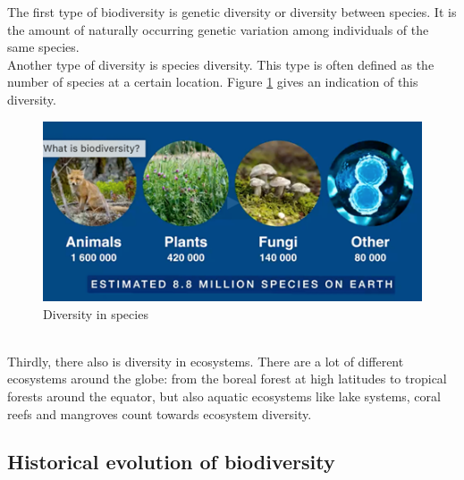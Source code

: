 \documentclass[../summary.tex]{subfiles}
\begin{document}
	The first type of biodiversity is genetic diversity or diversity between species. It is the amount of naturally occurring genetic variation among individuals of the same species. 
	\\
	Another type of diversity is species diversity. This type is often defined as the number of species at a certain location. Figure \ref{fig:diversity_species} gives an indication of this diversity.
	\begin{figure}[htbp]
		\centering
		\includegraphics[width=1\linewidth]{images/2-diversity_species.png}
		\caption{Diversity in species}
		\label{fig:diversity_species}
	\end{figure}
	\\
	Thirdly, there also is diversity in ecosystems. There are a lot of different ecosystems around the globe: from the boreal forest at high latitudes to tropical forests around the equator, but also aquatic ecosystems like lake systems, coral reefs and mangroves count towards ecosystem diversity.
	
	\subsection{Historical evolution of biodiversity}
	
\end{document}
